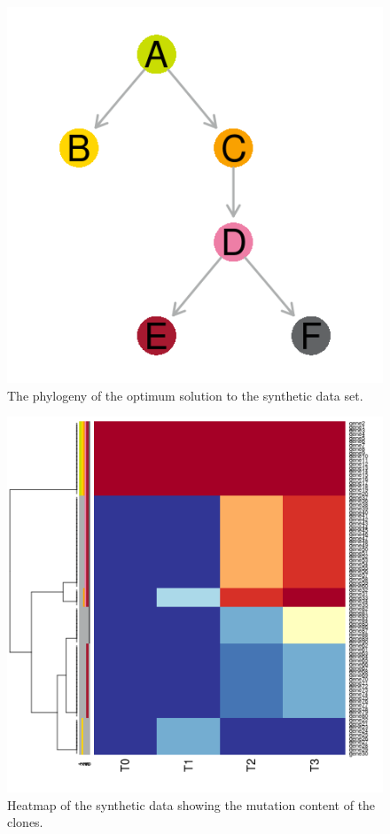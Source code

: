 \documentclass[a4paper]{article}\usepackage[]{graphicx}\usepackage[]{color}
\begin{document}
\begin{figure}[H]
    \centering
    \includegraphics[width=\textwidth]{gaga_synthetic_data_phylogeny.png}
    \caption{The phylogeny of the optimum solution to the synthetic data set.}
\end{figure}

\begin{figure}[H]
    \centering
    \includegraphics[width=\textwidth]{gaga_synthetic_data_heatmap.png}
    \caption{Heatmap of the synthetic data showing the mutation content of the clones.}
\end{figure}
\end{document}
